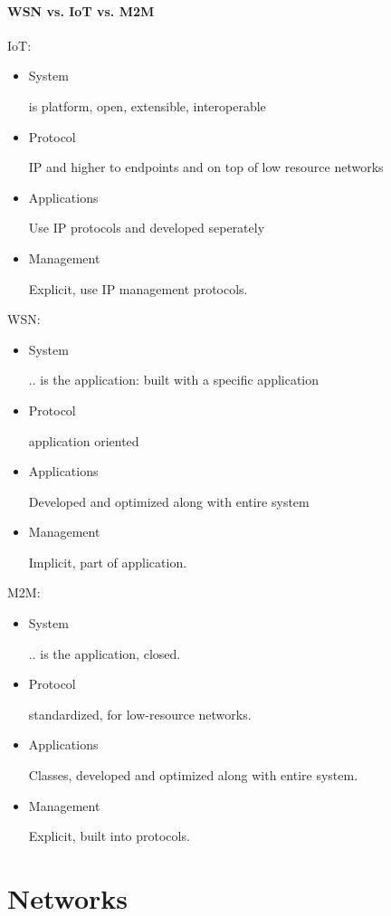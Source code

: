 \documentclass[11pt]{article}
\begin{document}
    \paragraph{WSN vs. IoT vs. M2M}
    IoT:
    \begin{itemize}
        \item System

        is platform, open, extensible, interoperable
        \item Protocol

        IP and higher to endpoints and on top of low resource networks
        \item Applications

        Use IP protocols and developed seperately
        \item Management

        Explicit, use IP management protocols.
    \end{itemize}
    WSN:
    \begin{itemize}
        \item System

        .. is the application: built with a specific application
        \item Protocol

        application oriented
        \item Applications

        Developed and optimized along with entire system
        \item Management

        Implicit, part of application.
    \end{itemize}
    M2M:
    \begin{itemize}
        \item System

        .. is the application, closed.
        \item Protocol

        standardized, for low-resource networks.
        \item Applications

        Classes, developed and optimized along with entire system.
        \item Management

        Explicit, built into protocols.
    \end{itemize}

    \section{Networks}
\end{document}
